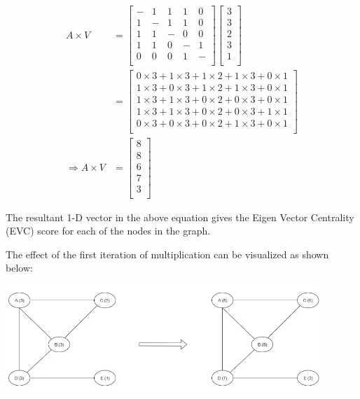 \documentclass[12pt, a4paper]{article}
\begin{document}
\begin{flushleft}
    \begin{equation*}
    \begin{split}
        A \times V & = \begin{bmatrix}
    - & 1 & 1 & 1 & 0 \\
    1 & - & 1 & 1 & 0 \\
    1 & 1 & - & 0 & 0 \\
    1 & 1 & 0 & - & 1 \\
    0 & 0 & 0 & 1 & - \\
    \end{bmatrix} 
    \begin{bmatrix}
    3 \\
    3 \\
    2 \\
    3 \\
    1 \\
    \end{bmatrix} \\ 
    & = \begin{bmatrix}
    0\times3 + 1\times3 + 1\times2 + 1\times3 + 0\times1 \\
    1\times3 + 0\times3 + 1\times2 + 1\times3 + 0\times1 \\
    1\times3 + 1\times3 + 0\times2 + 0\times3 + 0\times1 \\
    1\times3 + 1\times3 + 0\times2 + 0\times3 + 1\times1 \\
    0\times3 + 0\times3 + 0\times2 + 1\times3 + 0\times1 \\
    \end{bmatrix} \\
    \Rightarrow A \times V & =
    \begin{bmatrix}
    8 \\
    8 \\
    6 \\
    7 \\
    3 \\
    \end{bmatrix}
    \end{split} 
    \end{equation*}

    The resultant 1-D vector in the above equation gives the Eigen Vector Centrality (EVC) score for each of the nodes in the graph.

    The effect of the first iteration of multiplication can be visualized as shown below:

    \includegraphics[width=0.9\textwidth,center]{Transform}


\end{flushleft}
\end{document}
